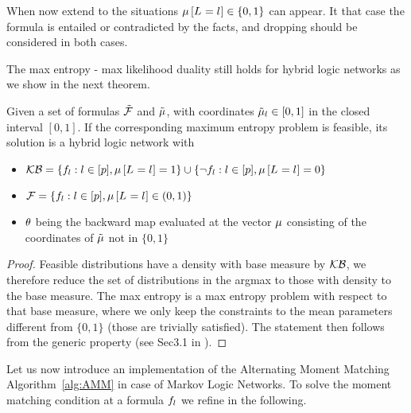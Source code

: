 When now extend to the situations $\mu\left[L_{}=l_{}\right]\in\{0,1\}$ can appear.
It that case the formula is entailed or contradicted by the facts, and dropping should be considered in both cases.

The max entropy - max likelihood duality still holds for hybrid logic networks as we show in the next theorem.

\begin{theorem}
	Given a set of formulas $\tilde{\mathcal{F}}$ and $\tilde{\mu}$, with coordinates $\tilde{\mu}_l\in[0,1]$ in the closed interval $[0,1]$.
	If the corresponding maximum entropy problem is feasible, its solution is a hybrid logic network with
	\begin{itemize}
		\item $\mathcal{KB}= \{f_{l} : l\in[p], \mu\left[L_{}=l_{}\right] = 1\} \cup \{\lnot f_{l} : l\in[p], \mu\left[L_{}=l_{}\right] = 0\} $
		\item $\mathcal{F} = \{f_{l} : l\in[p], \mu\left[L_{}=l_{}\right] \in (0,1)\}$
		\item $\theta$ being the backward map evaluated at the vector $\mu$ consisting of the coordinates of $\tilde{\mu}$ not in $\{0,1\}$
	\end{itemize}
\end{theorem}
\begin{proof}
	Feasible distributions have a density with base measure by $\mathcal{KB}$, we therefore reduce the set of distributions in the argmax to those with density to the base measure.
	The max entropy is a max entropy problem with respect to that base measure, where we only keep the constraints to the mean parameters different from $\{0,1\}$ (those are trivially satisfied).
	The statement then follows from the generic property (see Sec3.1 in \cite{wainwright_graphical_2008}).
\end{proof}






\label{sec:alternatingParEstMLN}

Let us now introduce an implementation of the Alternating Moment Matching Algorithm~\ref{alg:AMM} in case of Markov Logic Networks.
To solve the moment matching condition at a formula $f_{l}$ we refine  in the following.

